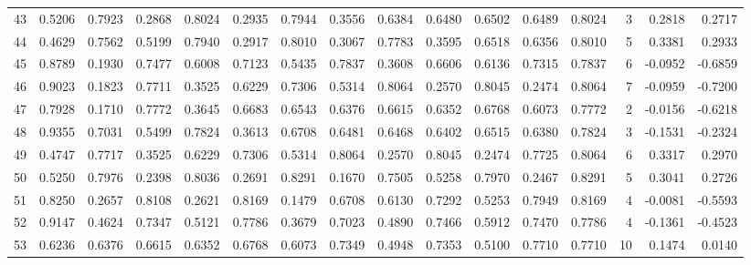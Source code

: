 \begin{tabular}{lrrrrrrrrrrrrrrr}
43  &      0.5206 &  0.7923 &  0.2868 &  0.8024 &  0.2935 &  0.7944 &  0.3556 &  0.6384 &  0.6480 &  0.6502 &   0.6489 &     0.8024 &      3 &                    0.2818 &                     0.2717 \\
44  &      0.4629 &  0.7562 &  0.5199 &  0.7940 &  0.2917 &  0.8010 &  0.3067 &  0.7783 &  0.3595 &  0.6518 &   0.6356 &     0.8010 &      5 &                    0.3381 &                     0.2933 \\
45  &      0.8789 &  0.1930 &  0.7477 &  0.6008 &  0.7123 &  0.5435 &  0.7837 &  0.3608 &  0.6606 &  0.6136 &   0.7315 &     0.7837 &      6 &                   -0.0952 &                    -0.6859 \\
46  &      0.9023 &  0.1823 &  0.7711 &  0.3525 &  0.6229 &  0.7306 &  0.5314 &  0.8064 &  0.2570 &  0.8045 &   0.2474 &     0.8064 &      7 &                   -0.0959 &                    -0.7200 \\
47  &      0.7928 &  0.1710 &  0.7772 &  0.3645 &  0.6683 &  0.6543 &  0.6376 &  0.6615 &  0.6352 &  0.6768 &   0.6073 &     0.7772 &      2 &                   -0.0156 &                    -0.6218 \\
48  &      0.9355 &  0.7031 &  0.5499 &  0.7824 &  0.3613 &  0.6708 &  0.6481 &  0.6468 &  0.6402 &  0.6515 &   0.6380 &     0.7824 &      3 &                   -0.1531 &                    -0.2324 \\
49  &      0.4747 &  0.7717 &  0.3525 &  0.6229 &  0.7306 &  0.5314 &  0.8064 &  0.2570 &  0.8045 &  0.2474 &   0.7725 &     0.8064 &      6 &                    0.3317 &                     0.2970 \\
50  &      0.5250 &  0.7976 &  0.2398 &  0.8036 &  0.2691 &  0.8291 &  0.1670 &  0.7505 &  0.5258 &  0.7970 &   0.2467 &     0.8291 &      5 &                    0.3041 &                     0.2726 \\
51  &      0.8250 &  0.2657 &  0.8108 &  0.2621 &  0.8169 &  0.1479 &  0.6708 &  0.6130 &  0.7292 &  0.5253 &   0.7949 &     0.8169 &      4 &                   -0.0081 &                    -0.5593 \\
52  &      0.9147 &  0.4624 &  0.7347 &  0.5121 &  0.7786 &  0.3679 &  0.7023 &  0.4890 &  0.7466 &  0.5912 &   0.7470 &     0.7786 &      4 &                   -0.1361 &                    -0.4523 \\
53  &      0.6236 &  0.6376 &  0.6615 &  0.6352 &  0.6768 &  0.6073 &  0.7349 &  0.4948 &  0.7353 &  0.5100 &   0.7710 &     0.7710 &     10 &                    0.1474 &                     0.0140 \\

\end{tabular}
